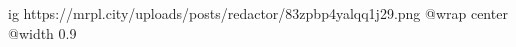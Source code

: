  
 
 
 
 

\ifcmt
  ig https://mrpl.city/uploads/posts/redactor/83zpbp4yalqq1j29.png
  @wrap center
  @width 0.9
\fi
